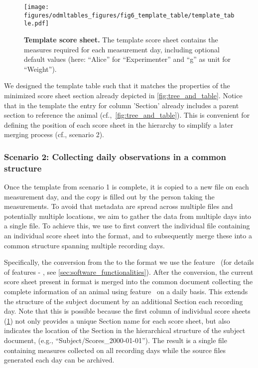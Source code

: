 \begin{figure}[hbt]
\begin{center}
\texttt{[image: figures/odmltables\_figures/fig6\_template\_table/template\_table.pdf]}
\caption[Template score sheet]{\label{fig:template_table}
\textbf{Template score sheet.} The template score sheet contains the measures required for each measurement day, including optional default values (here: ``Alice'' for ``Experimenter'' and ``g'' as unit for ``Weight'').}
\end{center}
\end{figure}

We designed the template table such that it matches the properties of the minimized score sheet section already depicted in \cref{fig:tree_and_table}. Notice that in the template the entry for column 'Section' already includes a parent section to reference the animal (cf.,~\cref{fig:tree_and_table}). This is convenient for defining the position of each score sheet in the  hierarchy to simplify a later merging process (cf., scenario 2).

\subsubsection*{Scenario 2: Collecting daily observations in a common  structure}

Once the template from scenario 1 is complete, it is copied to a new file on each measurement day, and the copy is filled out by the person taking the measurements. To avoid that metadata are spread across multiple files and potentially multiple locations, we aim to gather the data from multiple days into a single  file. To achieve this, we use  to first convert the individual  file containing an individual score sheet into the  format, and to subsequently merge these into a common  structure spanning multiple recording days.

Specifically, the conversion from the  to the  format we use the  feature \fconvert\ (for details of  features \fconvert - \ffilter, see \cref{sec:software_functionalities}). After the conversion, the current score sheet present in  format is merged into the common  document collecting the complete information of an animal using feature \fmerge \ on a daily basis. This extends the  structure of the subject document by an additional Section each recording day. Note that this is possible because the first column of individual score sheets (\cref{fig:template_table}) not only provides a unique Section name for each score sheet, but also indicates the location of the  Section in the hierarchical structure of the subject document, (e.g., ``Subject/Scores\_2000-01-01''). The result is a single  file containing measures collected on all recording days while the source files generated each day can be archived.

